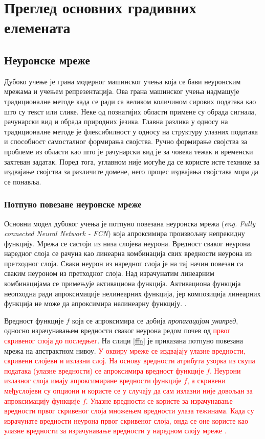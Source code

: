 \documentclass[11pt,oneside]{memoir}
\begin{document}
\chapter{Преглед основних градивних елемената}
\label{chp:razrada}

\section{Неуронске мреже}

Дубоко учење је грана модерног машинског учења која се бави неуронским мрежама и учењем репрезентација. 
Ова грана машинског учења надмашује традиционалне методе када се ради са великом количином сирових података
као што су текст или слике. 
Неке од познатијих области примене су обрада сигнала, рачунарски вид и обрада природних језика. 
Главна разлика у односу на традиционалне методе је флексибилност у односу на структуру улазних података и
способност самосталног формирања својства. Ручно формирање својства за проблеме из области као што је рачунарски вид је за човека тежак
и временски захтеван задатак. Поред тога, углавном није могуће да се користе исте технике за издвајање својства за различите домене, него
процес издвајања својстава мора да се понавља.

\subsection{Потпуно повезане неуронске мреже}

Основни модел дубоког учења је потпуно повезана неуронска мрежа (\textit{eng. Fully connected Neural Network - FCN}) која
апроксимира произвољну непрекидну функцију. Мрежа се састоји из
низа слојева неурона. Вредност сваког неурона наредног слоја се рачуна као линеарна комбинација свих вредности неурона из претходног слоја. 
Сваки неурон из наредног слоја је на тај начин повезан са сваким неуроном из претходног слоја. Над израчунатим линеарним комбинацијама се примењује
активациона функција. Активациона функција неопходна ради апроксимације нелинеарних функција, јер композиција линеарних функција не може
да апроксимира нелинеарну функцију.  \cite{deep_learning_goodfellow, ml_mladen}.

Вредност функције $f$ која 
се апроксимира се добија \textit{пропагацијом унапред}, односно израчунавањем вредности сваког неурона редом почев од
\textcolor{red}{првог скривеног слоја до последњег}. На слици
\ref{ffn} је приказана потпуно повезана мрежа на апстрактном нивоу.
\textcolor{red}{У оквиру мреже се издвајају улазне вредности, скривени слојеви и излазни слој. На основу
вредности атрибута узорка из скупа података (улазне вредности) се апроксимира вредност функције $f$. Неурони излазног слоја имају апроксимиране вредности функције $f$, а
скривени међуслојеви су опциони и користе се у случају да сам излазни није довољан за апроксимацију функције $f$.
Улазне вредности се користе за израчунавање вредности првог скривеног слоја множењем вредности улаза тежинама. Када су израчунате вредности неурона првог скривеног слоја, онда се оне користе као улазне вредности за израчунавање
вредности у наредном слоју мреже \cite{deep_learning_goodfellow}.}
\end{document}
